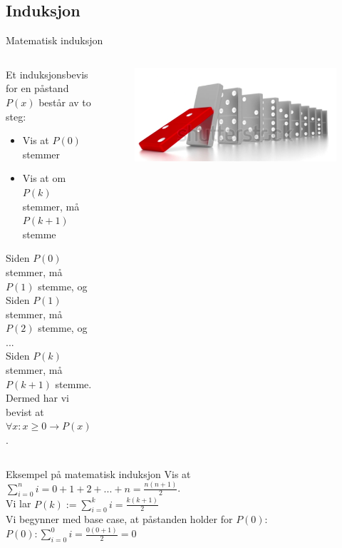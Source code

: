 \subsection{Induksjon}
\begin{frame}{Matematisk induksjon}
    \begin{columns}
        \begin{column}{0.65\textwidth}
            Et induksjonsbevis for en påstand $P(x)$ består av to steg:
            \begin{itemize}
                \item Vis at $P(0)$ stemmer
                \item Vis at om $P(k)$ stemmer, må $P(k+1)$ stemme
            \end{itemize}
        
            \pause
            Siden $P(0)$ stemmer, må $P(1)$ stemme, og\\
            Siden $P(1)$ stemmer, må $P(2)$ stemme, og\\
            ...\\
            Siden $P(k)$ stemmer, må $P(k+1)$ stemme.\\[1.5mm]
        
            \pause
            Dermed har vi bevist at $\forall x : x \geq 0 \rightarrow P(x)$.
        \end{column}
        \pause
        \begin{column}{0.2\textwidth}
            \begin{figure}
                \includegraphics[scale=0.1,left]{images/domino.PNG}
            \end{figure}
        \end{column}
    \end{columns}
\end{frame}

\begin{frame}{Eksempel på matematisk induksjon}
    Vis at $\sum_{i=0}^{n} i = 0 + 1 + 2 + ... + n = \frac{n(n+1)}{2}$.\\[4mm]
\pause    
    Vi lar $P(k) := \sum_{i=0}^{k} i = \frac{k(k+1)}{2}$\\[2mm]
\pause
    Vi begynner med base case, at påstanden holder for $P(0)$:\\
    $P(0): \sum_{i=0}^{0} i = \frac{0(0+1)}{2} = 0$ \checkmark\\
\end{frame}

